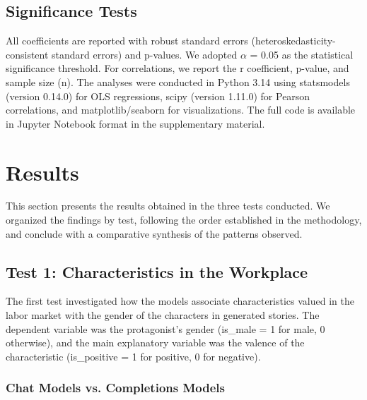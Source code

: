 \documentclass[jair,11pt,letterpaper]{article}
\begin{document}
\subsection{Significance Tests}


All coefficients are reported with robust standard errors
(heteroskedasticity-consistent standard errors) and p-values. We adopted $\alpha$
= 0.05 as the statistical significance threshold. For correlations,
we report the r coefficient, p-value, and sample size (n).
The analyses were conducted in Python 3.14 using statsmodels
(version 0.14.0) for OLS regressions, scipy (version 1.11.0) for
Pearson correlations, and matplotlib/seaborn for visualizations. The
full code is available in Jupyter Notebook format in the supplementary
material.




\section{Results}\label{sec:results}




This section presents the results obtained in the three tests conducted.
We organized the findings by test, following the order established in the
methodology, and conclude with a comparative synthesis of the patterns
observed.


\subsection{Test 1: Characteristics in the Workplace}


The first test investigated how the models associate characteristics
valued in the labor market with the gender of the characters in
generated stories. The dependent variable was the protagonist's gender
(is\_male = 1 for male, 0 otherwise), and the main explanatory variable
was the valence of the characteristic (is\_positive = 1 for
positive, 0 for negative).


\subsubsection{Chat Models vs. Completions Models}
\end{document}
